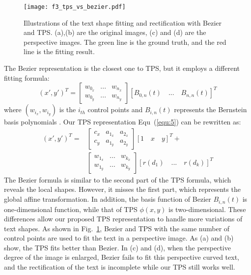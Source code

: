 \documentclass[sigconf]{acmart}
\begin{document}
	\begin{figure}
		\centering
		\setlength{\abovecaptionskip}{2px}
		\subfigbottomskip=-3pt
		\subfigcapskip=-5pt
		\texttt{[image: f3\_tps\_vs\_bezier.pdf]}
		\caption{Illustrations of the text shape fitting and rectification with Bezier \cite{Liu2020ABCNet} and TPS. (a),(b) are the original images, (c) and (d) are the perspective images. The green line is the ground truth, and the red line is the fitting result.}
		\label{fig:tps_vs_bezier}
		\vspace{-12px}
	\end{figure}
	
	The Bezier \cite{Liu2020ABCNet, abcnetv2} representation is the closest one to TPS, but it employs a different fitting formula:
	\begin{equation}
	(x',y')^T = \left [
	\begin{aligned}
	w_{0_x} & ... &  w_{n_x}\\
	w_{0_y} & ... &  w_{n_y}
	\end{aligned}
	\right]
	[B_{0,n}(t) \quad ... \quad B_{n,n}(t)] ^T
	\end{equation}
	where $(w_{i_x}, w_{i_y})$ is the $i_{th}$ control points and $B_{i,n}(t)$ represents the Bernstein basis polynomials \cite{Liu2020ABCNet}. Our TPS representation Equ~(\ref{equ:5}) can be rewritten as:
	\begin{equation}
	\begin{aligned}
	(x',y')^T = & \left [
	\begin{array}{ccc}
	c_x & a_{1_x} & a_{2_x}  \\
	c_y & a_{1_y} & a_{2_y} 
	\end{array}
	\right ]
	[1 \quad x \quad y] ^T + \\
	&\left [
	\begin{aligned}
	w_{1_x} & ... &  w_{k_x}\\
	w_{1_y} & ... &  w_{k_y}
	\end{aligned}
	\right] [r(d_1) \quad ... \quad r(d_k)]^T
	\end{aligned}
	\end{equation}
	The Bezier formula is similar to the second part of the TPS formula, which reveals the local shapes. However, it misses the first part, which represents the global affine transformation. In addition, the basis function of Bezier $B_{i,n}(t)$ is one-dimensional function, while that of TPS $\phi(x,y)$ is two-dimensional. These differences allow our proposed TPS representation to handle more variations of text shapes. As shown in Fig.~\ref{fig:tps_vs_bezier}, Bezier and TPS with the same number of control points are used to fit the text in a perspective image. As (a) and (b) show, the TPS fits better than Bezier. In (c) and (d), when the perspective degree of the image is enlarged, 
	Bezier fails to fit this perspective curved text, and the rectification of the text is incomplete while our TPS still works well. 
	
\end{document}
